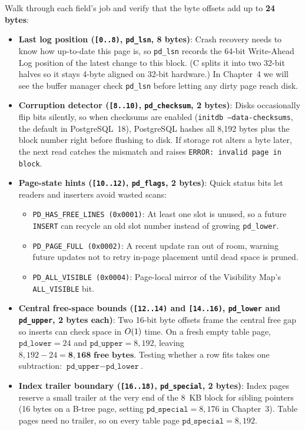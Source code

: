 Walk through each field's job and verify that the byte offsets add up to \textbf{24 bytes}:
\begin{itemize}
  \item \textbf{Last log position (\texttt{[0..8)}, \texttt{pd\_lsn}, 8 bytes)}: Crash recovery needs to know how up-to-date this page is, so \texttt{pd\_lsn} records the 64-bit Write-Ahead Log position of the latest change to this block. (C splits it into two 32-bit halves so it stays 4-byte aligned on 32-bit hardware.) In Chapter~4 we will see the buffer manager check \texttt{pd\_lsn} before letting any dirty page reach disk.
  \item \textbf{Corruption detector (\texttt{[8..10)}, \texttt{pd\_checksum}, 2 bytes)}: Disks occasionally flip bits silently, so when checksums are enabled (\texttt{initdb --data-checksums}, the default in PostgreSQL~18), PostgreSQL hashes all 8,192 bytes plus the block number right before flushing to disk. If storage rot alters a byte later, the next read catches the mismatch and raises \texttt{ERROR: invalid page in block}.
  \item \textbf{Page-state hints (\texttt{[10..12)}, \texttt{pd\_flags}, 2 bytes)}: Quick status bits let readers and inserters avoid wasted scans:
  \begin{itemize}
    \item \texttt{PD\_HAS\_FREE\_LINES (0x0001)}: At least one slot is unused, so a future \texttt{INSERT} can recycle an old slot number instead of growing \texttt{pd\_lower}.
    \item \texttt{PD\_PAGE\_FULL (0x0002)}: A recent update ran out of room, warning future updates not to retry in-page placement until dead space is pruned.
    \item \texttt{PD\_ALL\_VISIBLE (0x0004)}: Page-local mirror of the Visibility Map's \texttt{ALL\_VISIBLE} bit.
  \end{itemize}
  \item \textbf{Central free-space bounds (\texttt{[12..14)} and \texttt{[14..16)}, \texttt{pd\_lower} and \texttt{pd\_upper}, 2 bytes each)}: Two 16-bit byte offsets frame the central free gap so inserts can check space in $O(1)$ time. On a fresh empty table page, $\texttt{pd\_lower} = 24$ and $\texttt{pd\_upper} = 8{,}192$, leaving $8{,}192 - 24 = \mathbf{8{,}168\text{ free bytes}}$. Testing whether a row fits takes one subtraction: $\texttt{pd\_upper} - \texttt{pd\_lower}$.
  \item \textbf{Index trailer boundary (\texttt{[16..18)}, \texttt{pd\_special}, 2 bytes)}: Index pages reserve a small trailer at the very end of the 8~KB block for sibling pointers (16 bytes on a B-tree page, setting $\texttt{pd\_special} = 8{,}176$ in Chapter~3). Table pages need no trailer, so on every table page \textbf{$\texttt{pd\_special} = 8{,}192$}.

\end{itemize}
